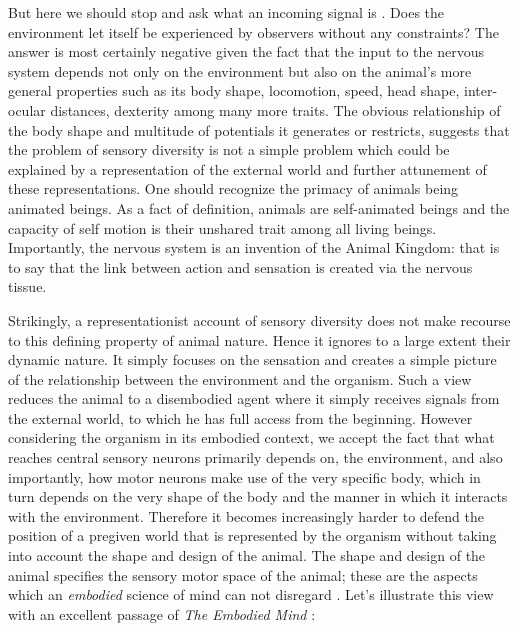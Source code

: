 But here we should stop and ask what an incoming signal is . Does the
environment let itself be experienced by observers without any
constraints? The answer is most certainly negative given the fact that the
input to the nervous system depends not only on the environment but also on
the animal's more general properties such as its body shape, locomotion,
speed, head shape, inter-ocular distances, dexterity among many more
traits.  The obvious relationship of the body shape and multitude of
potentials it generates or restricts, suggests that the problem of sensory
diversity is not a simple problem which could be explained by a
representation of the external world and further attunement of these
representations. One should recognize the primacy of animals being animated
beings. As a fact of definition, animals are self-animated beings and the
capacity of self motion is their unshared trait among all living beings.
Importantly, the nervous system is an invention of the Animal Kingdom: that
is to say that the link between action and sensation is created via the
nervous tissue.

Strikingly, a representationist account of sensory diversity does not make
recourse to this defining property of animal nature. Hence it ignores to a
large extent their dynamic nature. It simply focuses on the sensation and
creates a simple picture of the relationship between the environment and
the organism. Such a view reduces the animal to a disembodied agent where
it simply receives signals from the external world, to which he has full
access from the beginning. However considering the organism in its embodied
context, we accept the fact that what reaches central sensory neurons
primarily depends on, the environment, and also importantly, how motor
neurons make use of the very specific body, which in turn depends on the
very shape of the body and the manner in which it interacts with the
environment.  Therefore it becomes increasingly harder to defend the
position of a pregiven world that is represented by the organism without
taking into account the shape and design of the animal. The shape and
design of the animal specifies the sensory motor space of the animal; these
are the aspects which an \textit{embodied} science of mind can not
disregard \citep{clark1999a}.  Let's illustrate this view with an excellent
passage of \textit{The Embodied Mind} \citep{varela1992a}: 
 
